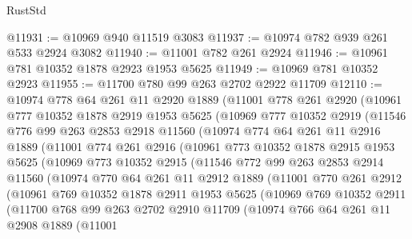 \begin{lexlean}{RustStd}
\begin{coremodule}
@11931 := @10969 @940 @11519 @3083
@11937 := @10974 @782 @939 @261 @533 @2924 @3082
@11940 := @11001 @782 @261 @2924
@11946 := @10961 @781 @10352 @1878 @2923 @1953 @5625
@11949 := @10969 @781 @10352 @2923
@11955 := @11700 @780 @99 @263 @2702 @2922 @11709
@12110 := @10974
    @778
    @64
    @261
    @11
    @2920
    @1889
    (@11001
      @778
      @261
      @2920
      (@10961
        @777
        @10352
        @1878
        @2919
        @1953
        @5625
        (@10969
          @777
          @10352
          @2919
          (@11546
            @776
            @99
            @263
            @2853
            @2918
            @11560
            (@10974
              @774
              @64
              @261
              @11
              @2916
              @1889
              (@11001
                @774
                @261
                @2916
                (@10961
                  @773
                  @10352
                  @1878
                  @2915
                  @1953
                  @5625
                  (@10969
                    @773
                    @10352
                    @2915
                    (@11546
                      @772
                      @99
                      @263
                      @2853
                      @2914
                      @11560
                      (@10974
                        @770
                        @64
                        @261
                        @11
                        @2912
                        @1889
                        (@11001
                          @770
                          @261
                          @2912
                          (@10961
                            @769
                            @10352
                            @1878
                            @2911
                            @1953
                            @5625
                            (@10969
                              @769
                              @10352
                              @2911
                              (@11700
                                @768
                                @99
                                @263
                                @2702
                                @2910
                                @11709
                                (@10974
                                  @766
                                  @64
                                  @261
                                  @11
                                  @2908
                                  @1889
                                  (@11001

\end{coremodule}
\end{lexlean}
